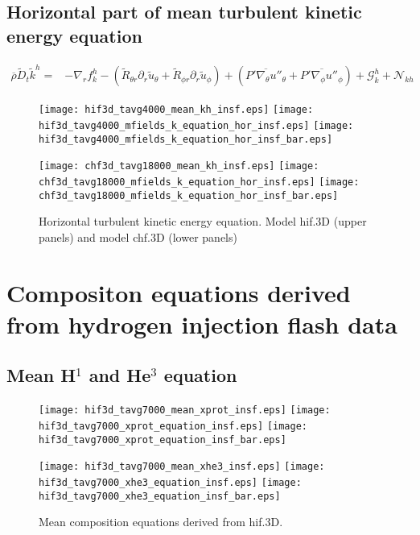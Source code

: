 \documentclass[10pt,paper=a4]{report}
\newcommand{\eht}{\overline}
\newcommand{\fht}{\widetilde}
\newcommand{\fav}{\widetilde}
\newcommand{\av}{\overline}
\begin{document}
\newpage

\subsection{Horizontal part of mean turbulent kinetic energy equation}

\begin{align}
\av{\rho} \fav{D}_t \fav{k}^h =  &  -\nabla_r f_k^h - (\fht{R}_{\theta r}\partial_r \fht{u}_\theta + \fht{R}_{\phi r}\partial_r \fht{u}_\phi) + (\eht{P' \nabla_\theta u''_\theta} + \eht{P' \nabla_\phi u''_\phi}) + {\mathcal G_k^h} + {\mathcal N_{kh}} 
\end{align}

\begin{figure}[!h]
\centerline{
\texttt{[image: hif3d\_tavg4000\_mean\_kh\_insf.eps]}
\texttt{[image: hif3d\_tavg4000\_mfields\_k\_equation\_hor\_insf.eps]}
\texttt{[image: hif3d\_tavg4000\_mfields\_k\_equation\_hor\_insf\_bar.eps]}}

\centerline{
\texttt{[image: chf3d\_tavg18000\_mean\_kh\_insf.eps]}
\texttt{[image: chf3d\_tavg18000\_mfields\_k\_equation\_hor\_insf.eps]}
\texttt{[image: chf3d\_tavg18000\_mfields\_k\_equation\_hor\_insf\_bar.eps]}}

\caption{Horizontal turbulent kinetic energy equation. Model {\sf hif.3D} (upper panels) and model {\sf chf.3D} (lower panels)}
\end{figure}

\newpage

\section{Compositon equations derived from hydrogen injection flash data}

\subsection{Mean H$^1$ and He$^3$ equation}

\begin{figure}[!h]
\centerline{
\texttt{[image: hif3d\_tavg7000\_mean\_xprot\_insf.eps]}
\texttt{[image: hif3d\_tavg7000\_xprot\_equation\_insf.eps]}
\texttt{[image: hif3d\_tavg7000\_xprot\_equation\_insf\_bar.eps]}}

\centerline{
\texttt{[image: hif3d\_tavg7000\_mean\_xhe3\_insf.eps]}
\texttt{[image: hif3d\_tavg7000\_xhe3\_equation\_insf.eps]}
\texttt{[image: hif3d\_tavg7000\_xhe3\_equation\_insf\_bar.eps]}}
\caption{Mean composition equations derived from {\sf hif.3D}. \label{fig:x-equations}}
\end{figure}
\end{document}
